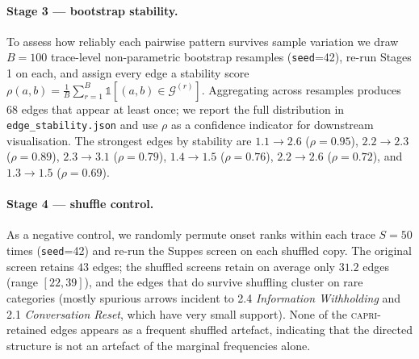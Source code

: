 \paragraph{Stage 3 — bootstrap stability.}
To assess how reliably each pairwise pattern survives sample variation
we draw $B{=}100$ trace-level non-parametric bootstrap resamples
(\texttt{seed}=42), re-run Stages 1 on each, and assign every
edge a stability score
$\rho(a,b) = \tfrac{1}{B}\sum_{r=1}^{B}\mathds{1}[(a,b)\in
\mathcal{G}^{(r)}]$.
Aggregating across resamples produces $68$ edges that appear at least
once; we report the full distribution in \texttt{edge\_stability.json}
and use $\rho$ as a confidence indicator for downstream visualisation.
The strongest edges by stability are
$1.1\!\to\!2.6$ ($\rho{=}0.95$),
$2.2\!\to\!2.3$ ($\rho{=}0.89$),
$2.3\!\to\!3.1$ ($\rho{=}0.79$),
$1.4\!\to\!1.5$ ($\rho{=}0.76$),
$2.2\!\to\!2.6$ ($\rho{=}0.72$), and
$1.3\!\to\!1.5$ ($\rho{=}0.69$).

\paragraph{Stage 4 — shuffle control.}
As a negative control, we randomly permute onset ranks within each
trace $S{=}50$ times (\texttt{seed}=42) and re-run the Suppes screen on
each shuffled copy. The original screen retains $43$ edges; the shuffled
screens retain on average only $31.2$ edges (range $[22, 39]$), and the
edges that do survive shuffling cluster on rare categories (mostly
spurious arrows incident to 2.4 \emph{Information Withholding} and 2.1
\emph{Conversation Reset}, which have very small support). None of the
\textsc{capri}-retained edges appears as a frequent shuffled artefact,
indicating that the directed structure is not an artefact of the
marginal frequencies alone.

